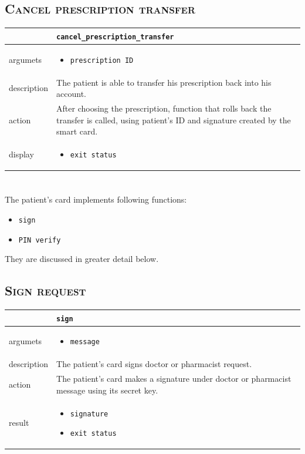 \section{\textsc{Cancel prescription transfer}}

\begin{tabularx}{\textwidth}{ |p{2.5cm}|X| }
	\hline
	 &  \texttt{cancel\_prescription\_transfer}\\
\hline	
argumets & 
\begin{itemize}
\item \texttt{prescription ID}
\end{itemize} \\
\hline
description & The patient is able to transfer his prescription back into his account.\\
\hline
action & After choosing the prescription, function that rolls back the transfer is called, using patient's ID and signature created by the smart card.\\
\hline
display &
\begin{itemize}
\item \texttt{exit status}
\end{itemize}\\
\hline
\end{tabularx}


\newpage

\chapter {}


The patient's card implements following functions:
\begin{itemize}
\item \texttt{sign}
\item \texttt{PIN verify}
\end{itemize}
They are discussed in greater detail below.

\section{\textsc{Sign request}}

\begin{tabularx}{\textwidth}{ |p{2.5cm}|X| }
	\hline
	 &  \texttt{sign}\\
\hline	
argumets & 
\begin{itemize}
\item \texttt{message}
\end{itemize} \\
\hline
description & The patient's card signs doctor or pharmacist request.\\
\hline
action & 
The patient's card makes a signature under doctor or pharmacist message using its secret key.
\\
\hline
result &
\begin{itemize}
\item \texttt{signature}
\item \texttt{exit status}
\end{itemize}\\
\hline
\end{tabularx}

